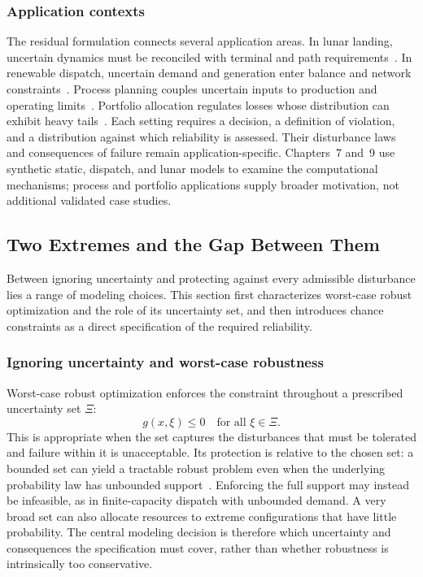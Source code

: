 \subsubsection{Application contexts}\label{ssec:domains}
The residual formulation connects several application areas. In lunar landing, uncertain dynamics must be reconciled with terminal and path requirements~\citep{keil2021}. In renewable dispatch, uncertain demand and generation enter balance and network constraints~\citep{bienstock2014}. Process planning couples uncertain inputs to production and operating limits~\citep{calfa2015}. Portfolio allocation regulates losses whose distribution can exhibit heavy tails~\citep{cont2001,rockafellar2000}. Each setting requires a decision, a definition of violation, and a distribution against which reliability is assessed. Their disturbance laws and consequences of failure remain application-specific. Chapters~7 and~9 use synthetic static, dispatch, and lunar models to examine the computational mechanisms; process and portfolio applications supply broader motivation, not additional validated case studies.

\subsection{Two Extremes and the Gap Between Them}\label{sec:extremes}
Between ignoring uncertainty and protecting against every admissible disturbance lies a range of modeling choices. This section first characterizes worst-case robust optimization and the role of its uncertainty set, and then introduces chance constraints as a direct specification of the required reliability.

\subsubsection{Ignoring uncertainty and worst-case robustness}\label{ssec:extremes}
Worst-case robust optimization enforces the constraint throughout a prescribed uncertainty set $\Xi$:
\begin{equation}
  g(x,\xi)\le0\quad\text{for all }\xi\in\Xi.
  \label{eq:robust}
\end{equation}
This is appropriate when the set captures the disturbances that must be tolerated and failure within it is unacceptable. Its protection is relative to the chosen set: a bounded set can yield a tractable robust problem even when the underlying probability law has unbounded support~\citep{bental2009}. Enforcing the full support may instead be infeasible, as in finite-capacity dispatch with unbounded demand. A very broad set can also allocate resources to extreme configurations that have little probability. The central modeling decision is therefore which uncertainty and consequences the specification must cover, rather than whether robustness is intrinsically too conservative.

